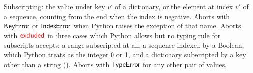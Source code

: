 Subscripting: the value under key $v'$ of a dictionary, or the element at index $v'$ of a sequence,
counting from the end when the index is negative. Aborts with $\mathsf{KeyError}$ or
$\mathsf{IndexError}$ when Python raises the exception of that name. Aborts with $\textcolor{red}{\mathsf{excluded}}$ in three cases which Python allows but no typing rule for subscripts accepts: a range subscripted at all, a sequence indexed by a Boolean, which Python treats as the integer 0 or 1, and a dictionary subscripted by a key other than a string (). Aborts with $\mathsf{TypeError}$ for any other pair of values.
